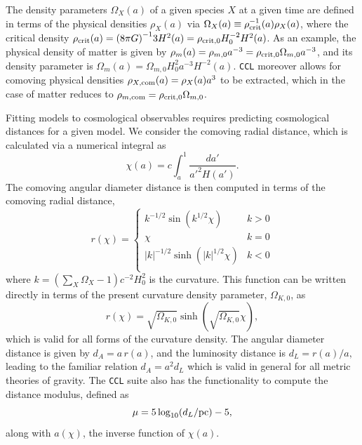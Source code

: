 \documentclass[\docopts]{\docclass}
\newcommand{\ccl}{{\tt CCL}\xspace}
\begin{document}
The density parameters $\Omega_X(a)$ of a given species $X$ at a given time are defined in terms of the physical densities $\rho_X(a)$ via $\Omega_X(a) \equiv \rho^{-1}_{\rm crit}(a) \rho_X(a)$, where the critical density $\rho_{\rm crit}(a) = {( 8 \pi G)}^{-1} 3H^2(a) = \rho_{\rm crit,0} H_0^{-2} H^2(a)$. As an example, the physical density of matter is given by $\rho_m(a) = \rho_{m,0} a^{-3} = \rho_{\rm crit,0} \Omega_{m,0} a^{-3}$, and its density parameter is $\Omega_m(a) = \Omega_{m,0} H_0^{2} a^{-3} H^{-2}(a)$. \ccl moreover allows for comoving physical densities $\rho_{X, {\rm com}}(a) = \rho_X(a) a^3$ to be extracted, which in the case of matter reduces to $\rho_{m, {\rm com}} = \rho_{\rm crit,0} \Omega_{m,0}$.

Fitting models to cosmological observables requires predicting cosmological distances for a given model. We consider the comoving radial distance, which is calculated via a numerical integral as
\begin{equation}
 \chi(a)= c \int_a^1 \frac{da'}{a'^2 H(a')}.
 \label{eq:comrdist}
\end{equation}
The comoving angular diameter distance is then computed in terms of the comoving radial distance,
\begin{equation}\label{eq:angdist}
 r(\chi)=\left\{\begin{array}{cc}
                 k^{-1/2}\sin(k^{1/2}\chi) & k>0\\
                 \chi & k=0\\
                 |k|^{-1/2}\sinh(|k|^{1/2}\chi) & k<0\\
                \end{array}\right.
\end{equation}
where $k = \left({\sum_X \Omega_X -1}\right) c^{-2} H_0^2$ is the curvature.
This function can be written directly in terms of the present curvature density parameter, $\Omega_{K,0}$, as
\begin{equation}\label{eq:angdist_omegak}
 r(\chi) = \sqrt{\Omega_{K,0}}\sinh(\sqrt{\Omega_{K,0}}\chi),
\end{equation}
which is valid for all forms of the curvature density.
The angular diameter distance is given by $d_A=a\,r(a)$, and the luminosity distance is
$d_L=r(a)/a,$ leading to the familiar relation $d_A = a^2d_L$ which is valid in general for all metric theories of gravity.
The \ccl suite also has the functionality to compute the distance modulus, defined as
\begin{equation}\label{eq:distmod}
    \mu = 5 \log_{10}(d_L / {\rm pc})-5,
\end{equation}
along with $a(\chi)$, the inverse function of $\chi(a)$.
\end{document}
